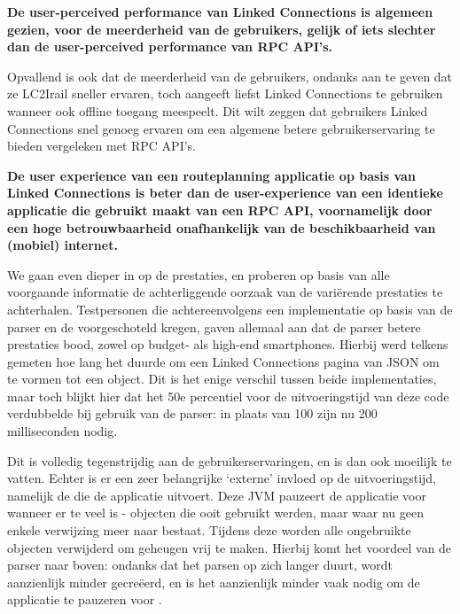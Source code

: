 \textbf{De user-perceived performance van Linked Connections is algemeen gezien, voor de meerderheid van de gebruikers, gelijk of iets slechter dan de user-perceived performance van RPC API's.}

Opvallend is ook dat de meerderheid van de gebruikers, ondanks aan te geven dat ze LC2Irail sneller ervaren, toch aangeeft liefst Linked Connections te gebruiken wanneer ook offline toegang meespeelt. Dit wilt zeggen dat gebruikers Linked Connections snel genoeg ervaren om een algemene betere gebruikerservaring te bieden vergeleken met RPC API's.

\textbf{De user experience van een routeplanning applicatie op basis van Linked Connections is beter dan de user-experience van een identieke applicatie die gebruikt maakt van een RPC API, voornamelijk door een hoge betrouwbaarheid onafhankelijk van de beschikbaarheid van (mobiel) internet.}

We gaan even dieper in op de prestaties, en proberen op basis van alle voorgaande informatie de achterliggende oorzaak van de variërende prestaties te achterhalen. Testpersonen die achtereenvolgens een implementatie op basis van de  parser en de  voorgeschoteld kregen, gaven allemaal aan dat de  parser betere prestaties bood, zowel op budget- als high-end smartphones. Hierbij werd telkens gemeten hoe lang het duurde om een Linked Connections pagina van JSON om te vormen tot een object. Dit is het enige verschil tussen beide implementaties, maar toch blijkt hier dat het 50e percentiel voor de uitvoeringstijd van deze code verdubbelde bij gebruik van de  parser: in plaats van 100 zijn nu 200 milliseconden nodig.

Dit is volledig tegenstrijdig aan de gebruikerservaringen, en is dan ook moeilijk te vatten. Echter is er een zeer belangrijke `externe' invloed op de uitvoeringstijd, namelijk de  die de applicatie uitvoert. Deze JVM pauzeert de applicatie voor  wanneer er te veel  is - objecten die ooit gebruikt werden, maar waar nu geen enkele verwijzing meer naar bestaat. Tijdens deze  worden alle ongebruikte objecten verwijderd om geheugen vrij te maken. Hierbij komt het voordeel van de  parser naar boven: ondanks dat het parsen op zich langer duurt, wordt aanzienlijk minder  gecreëerd, en is het aanzienlijk minder vaak nodig om de applicatie te pauzeren voor .


